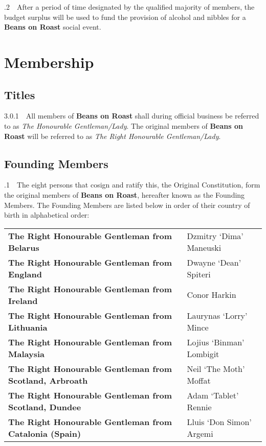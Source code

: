 \documentclass[a4paper,11pt]{article}
\begin{document}
.2$\quad$After a period of time designated by the qualified majority of members, the budget surplus will be used to fund the provision of alcohol and nibbles for a \textbf{Beans on Roast} social event.

\section{Membership}
\label{Membership}
\subsection{Titles}
\label{Titles}
3.0.1$\quad$All members of \textbf{Beans on Roast} shall during official business be referred to as \textit{The Honourable Gentleman/Lady}. The original members of \textbf{Beans on Roast} will be referred to as \textit{The Right Honourable Gentleman/Lady}.

\subsection{Founding Members}
\label{Founding Members}
.1$\quad$The eight persons that cosign and ratify this, the Original Constitution, form the original members of \textbf{Beans on Roast}, hereafter known as the Founding Members. The Founding Members are listed below in order of their country of birth in alphabetical order: 

\begin{table}[h!]
\begin{tabular}{ll}
\textbf{The Right Honourable Gentleman from Belarus} & Dzmitry `Dima'  Maneuski \\
\textbf{The Right Honourable Gentleman from England} & Dwayne `Dean' Spiteri \\
\textbf{The Right Honourable Gentleman from Ireland} & Conor Harkin \\
\textbf{The Right Honourable Gentleman from Lithuania} & Laurynas `Lorry' Mince \\
\textbf{The Right Honourable Gentleman from Malaysia} & Lojius `Binman' Lombigit \\
\textbf{The Right Honourable Gentleman from Scotland, Arbroath} & Neil `The Moth' Moffat \\
\textbf{The Right Honourable Gentleman from Scotland, Dundee} & Adam `Tablet' Rennie \\
\textbf{The Right Honourable Gentleman from Catalonia (Spain)} & Lluis `Don Simon' Argemi
\end{tabular}
\end{table}
\end{document}
